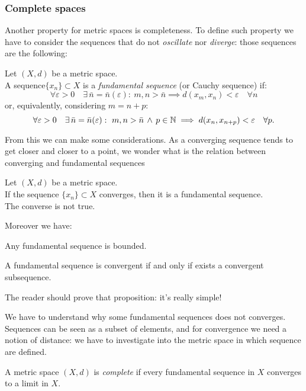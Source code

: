 \subsubsection{Complete spaces}

Another property for metric spaces is completeness. To define such property we have to consider the sequences that do not \textit{oscillate} nor \textit{diverge}: those sequences are the following:

\begin{defn}
    Let $(X,d)$ be a metric space.\\
     A sequence$\{x_n\} \subset X$ is a \emph{fundamental sequence} (or Cauchy sequence) if:
    $$\forall \varepsilon > 0 \quad \exists \, \bar n  = \bar n (\varepsilon): \ m,n > \bar n \implies d(x_m, x_n) < \varepsilon \quad \forall n$$
    or, equivalently, considering $m=n+p$:
    $$\forall \varepsilon > 0 \quad \exists \, \bar n  = \bar n (\varepsilon): \ m,n > \bar n \, \wedge\, p \in \mathbb N \implies d(x_n, x_{n+p}) < \varepsilon \quad \forall p.$$
\end{defn}

From this we can make some considerations. As a converging sequence tends to get closer and closer to a point, we wonder what is the relation between converging and fundamental sequences

\begin{prop}
	Let $(X,d)$ be a metric space.\\
	If the sequence $\{x_n\} \subset X$ converges, then it is a fundamental sequence.\\
	The converse is not true.
\end{prop}
Moreover we have:

\begin{prop}
	Any fundamental sequence is bounded.
\end{prop}
\begin{prop}
	A fundamental sequence is convergent if and only if exists a convergent subsequence.
\end{prop}
The reader should prove that proposition: it's really simple!

We have to understand why some fundamental sequences does not converges. Sequences can be seen as a subset of elements, and for convergence we need a notion of distance: we have to investigate into the metric space in which sequence are defined.
\begin{defn} \label{complete-space-defn}
    A metric space $(X,d)$ is \emph{complete} if every fundamental sequence in $X$ converges to a limit in $X$. 
\end{defn}

